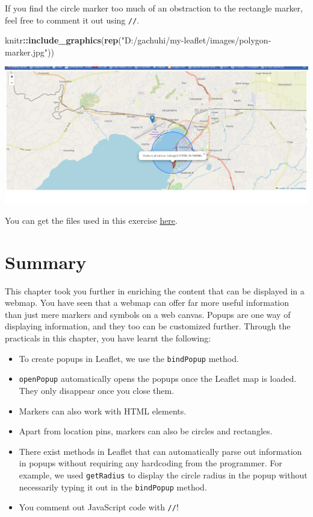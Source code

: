 \documentclass[
]{book}
\newenvironment{Shaded}{\begin{snugshade}}{\end{snugshade}}
\newcommand{\FunctionTok}[1]{\textcolor[rgb]{0.13,0.29,0.53}{\textbf{#1}}}
\newcommand{\NormalTok}[1]{#1}
\newcommand{\SpecialCharTok}[1]{\textcolor[rgb]{0.81,0.36,0.00}{\textbf{#1}}}
\newcommand{\StringTok}[1]{\textcolor[rgb]{0.31,0.60,0.02}{#1}}
\begin{document}
If you find the circle marker too much of an obstraction to the rectangle marker, feel free to comment it out using \texttt{//}.

\begin{Shaded}
\begin{Highlighting}[]
\NormalTok{knitr}\SpecialCharTok{::}\FunctionTok{include\_graphics}\NormalTok{(}\FunctionTok{rep}\NormalTok{(}\StringTok{"D:/gachuhi/my{-}leaflet/images/polygon{-}marker.jpg"}\NormalTok{))}
\end{Highlighting}
\end{Shaded}

\includegraphics{../images/polygon-marker.jpg}

You can get the files used in this exercise \href{https://github.com/sammigachuhi/my-leaflet-project/tree/main/my-leaflet-code/chapter-3-markers}{here}.

\hypertarget{summary-2}{%
\section{Summary}\label{summary-2}}

This chapter took you further in enriching the content that can be displayed in a webmap. You have seen that a webmap can offer far more useful information than just mere markers and symbols on a web canvas. Popups are one way of displaying information, and they too can be customized further. Through the practicals in this chapter, you have learnt the following:

\begin{itemize}
\item
  To create popups in Leaflet, we use the \texttt{bindPopup} method.
\item
  \texttt{openPopup} automatically opens the popups once the Leaflet map is loaded. They only disappear once you close them.
\item
  Markers can also work with HTML elements.
\item
  Apart from location pins, markers can also be circles and rectangles.
\item
  There exist methods in Leaflet that can automatically parse out information in popups without requiring any hardcoding from the programmer. For example, we used \texttt{getRadius} to display the circle radius in the popup without necessarily typing it out in the \texttt{bindPopup} method.
\item
  You comment out JavaScript code with \texttt{//}!
\end{itemize}
\end{document}
